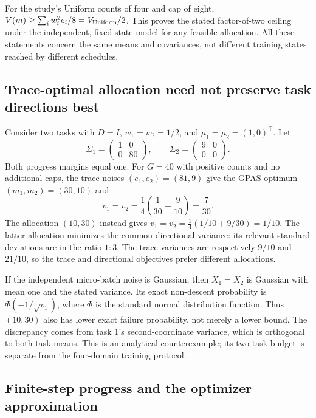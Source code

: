 For the study's Uniform counts of four and cap of eight,
$V(m)\geq\sum_i w_i^2e_i/8=V_{\rm Uniform}/2$.
This proves the stated factor-of-two ceiling under the independent,
fixed-state model for any feasible allocation. All these statements
concern the same means and covariances, not different training states
reached by different schedules.

\subsection{Trace-optimal allocation need not preserve task directions best}
\label{app:trace_counterexample}

Consider two tasks with $D=I$, $w_1=w_2=1/2$, and
$\mu_1=\mu_2=(1,0)^\top$. Let
\begin{equation}
    \Sigma_1=\begin{pmatrix}1&0\\0&80\end{pmatrix},\qquad
    \Sigma_2=\begin{pmatrix}9&0\\0&0\end{pmatrix}.
\end{equation}
Both progress margins equal one. For $G=40$ with positive counts and
no additional caps, the trace noises $(e_1,e_2)=(81,9)$ give the
GPAS optimum $(m_1,m_2)=(30,10)$ and
\begin{equation}
    v_1=v_2=\frac14\left(\frac1{30}+\frac9{10}\right)
      =\frac7{30}.
\end{equation}
The allocation $(10,30)$ instead gives
$v_1=v_2=\tfrac14(1/10+9/30)=1/10$.
The latter allocation minimizes the common directional variance:
its relevant standard deviations are in the ratio $1:3$.
The trace variances are respectively $9/10$ and $21/10$, so the
trace and directional objectives prefer different allocations.

If the independent micro-batch noise is Gaussian, then
$X_1=X_2$ is Gaussian with mean one and the stated variance.
Its exact non-descent probability is $\Phi(-1/\sqrt{v_1})$, where
$\Phi$ is the standard normal distribution function. Thus $(10,30)$
also has lower exact failure probability, not merely a lower bound.
The discrepancy comes from task 1's second-coordinate variance, which
is orthogonal to both task means. This is an analytical counterexample;
its two-task budget is separate from the four-domain training protocol.

\subsection{Finite-step progress and the optimizer approximation}
\label{app:descent}

